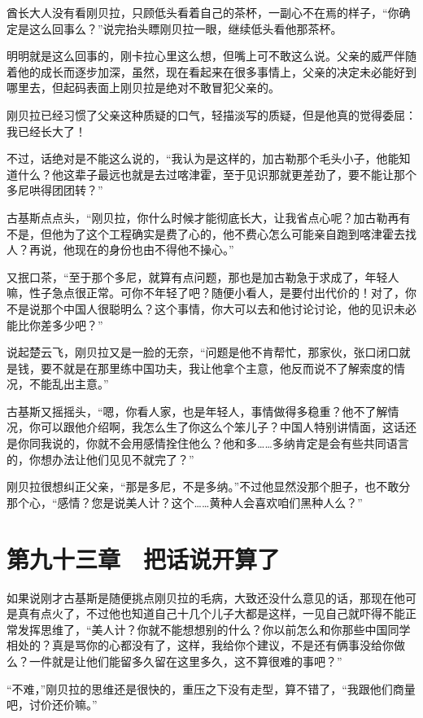 酋长大人没有看刚贝拉，只顾低头看着自己的茶杯，一副心不在焉的样子，“你确定是这么回事么？”说完抬头瞟刚贝拉一眼，继续低头看他那茶杯。

明明就是这么回事的，刚卡拉心里这么想，但嘴上可不敢这么说。父亲的威严伴随着他的成长而逐步加深，虽然，现在看起来在很多事情上，父亲的决定未必能好到哪里去，但起码表面上刚贝拉是绝对不敢冒犯父亲的。

刚贝拉已经习惯了父亲这种质疑的口气，轻描淡写的质疑，但是他真的觉得委屈：我已经长大了！

不过，话绝对是不能这么说的，“我认为是这样的，加古勒那个毛头小子，他能知道什么？他这辈子最远也就是去过喀津霍，至于见识那就更差劲了，要不能让那个多尼哄得团团转？”

古基斯点点头，“刚贝拉，你什么时候才能彻底长大，让我省点心呢？加古勒再有不是，但他为了这个工程确实是费了心的，他不费心怎么可能亲自跑到喀津霍去找人？再说，他现在的身份也由不得他不操心。”

又抿口茶，“至于那个多尼，就算有点问题，那也是加古勒急于求成了，年轻人嘛，性子急点很正常。可你不年轻了吧？随便小看人，是要付出代价的！对了，你不是说那个中国人很聪明么？这个事情，你大可以去和他讨论讨论，他的见识未必能比你差多少吧？”

说起楚云飞，刚贝拉又是一脸的无奈，“问题是他不肯帮忙，那家伙，张口闭口就是钱，要不就是在那里练中国功夫，我让他拿个主意，他反而说不了解索度的情况，不能乱出主意。”

古基斯又摇摇头，“嗯，你看人家，也是年轻人，事情做得多稳重？他不了解情况，你可以跟他介绍啊，我怎么生了你这么个笨儿子？中国人特别讲情面，这话还是你同我说的，你就不会用感情拴住他么？他和多……多纳肯定是会有些共同语言的，你想办法让他们见见不就完了？”

刚贝拉很想纠正父亲，“那是多尼，不是多纳。”不过他显然没那个胆子，也不敢分那个心，“感情？您是说美人计？这个……黄种人会喜欢咱们黑种人么？”

\section{第九十三章　把话说开算了}

如果说刚才古基斯是随便挑点刚贝拉的毛病，大致还没什么意见的话，那现在他可是真有点火了，不过他也知道自己十几个儿子大都是这样，一见自己就吓得不能正常发挥思维了，“美人计？你就不能想想别的什么？你以前怎么和你那些中国同学相处的？真是骂你的心都没有了，这样，我给你个建议，不是还有俩事没给你做么？一件就是让他们能留多久留在这里多久，这不算很难的事吧？”

“不难，”刚贝拉的思维还是很快的，重压之下没有走型，算不错了，“我跟他们商量吧，讨价还价嘛。”

